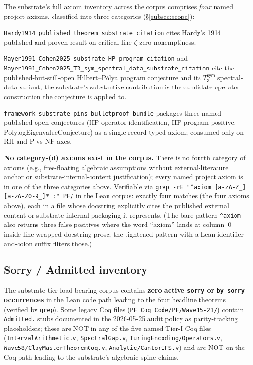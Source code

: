 \documentclass[11pt,a4paper]{amsart}
\theoremstyle{plain}
\theoremstyle{definition}
\begin{document}
The substrate's full axiom inventory across the corpus comprises \emph{four} named project axioms, classified into three categories (\S\ref{subsec:scope}):

\begin{description}[font=\normalfont\bfseries,leftmargin=2em,itemsep=2pt]
\item[(a) external-anchor citation of external proven theorem.] \texttt{Hardy1914\_published\_theorem\_substrate\_citation} cites Hardy's 1914 published-and-proven result on critical-line $\zeta$-zero nonemptiness.
\item[(b) Named-open-conjecture citation.] \texttt{Mayer1991\_Cohen2025\_substrate\_HP\_program\_citation} and \texttt{Mayer1991\_Cohen2025\_T3\_sym\_spectral\_data\_substrate\_citation} cite the published-but-still-open Hilbert--P\'olya program conjecture and its $T_3^{\textsf{sym}}$ spectral-data variant; the substrate's substantive contribution is the candidate operator construction the conjecture is applied to.
\item[(c) Substrate-internal-content packaging.] \texttt{framework\_substrate\_pins\_bulletproof\_bundle} packages three named published open conjectures (HP-operator-identification, HP-program-positive, PolylogEigenvalueConjecture) as a single record-typed axiom; consumed only on RH and P-vs-NP axes.
\end{description}

\textbf{No category-(d) axioms exist in the corpus.} There is no fourth category of axioms (e.g., free-floating algebraic assumptions without external-literature anchor or substrate-internal-content justification); every named project axiom is in one of the three categories above. Verifiable via \texttt{grep -rE "\textasciicircum axiom [a-zA-Z\_][a-zA-Z0-9\_]* :" PF/} in the Lean corpus: exactly four matches (the four axioms above), each in a file whose docstring explicitly cites the published external content or substrate-internal packaging it represents. (The bare pattern \texttt{\textasciicircum axiom\ } also returns three false positives where the word ``axiom'' lands at column~0 inside line-wrapped docstring prose; the tightened pattern with a Lean-identifier-and-colon suffix filters those.)

\subsection{Sorry / Admitted inventory}\label{subsec:repro-sorry}

The substrate-tier load-bearing corpus contains \textbf{zero active \texttt{sorry} or \texttt{by sorry} occurrences} in the Lean code path leading to the four headline theorems (verified by \texttt{grep}). Some legacy Coq files (\texttt{PF\_Coq\_Code/PF/Wave15-21/}) contain \texttt{Admitted.} stubs documented in the 2026-05-25 audit policy as parity-tracking placeholders; these are NOT in any of the five named Tier-I Coq files (\texttt{IntervalArithmetic.v}, \texttt{SpectralGap.v}, \texttt{TuringEncoding/Operators.v}, \texttt{Wave58/ClayMasterTheoremCoq.v}, \texttt{Analytic/CantorIFS.v}) and are NOT on the Coq path leading to the substrate's algebraic-spine claims.
\end{document}
